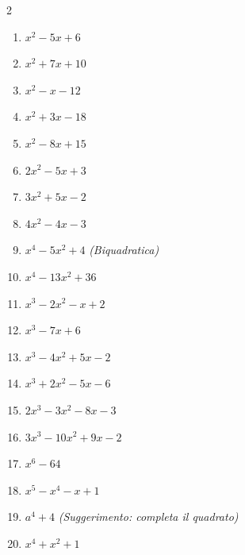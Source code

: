\begin{multicols}{2}
\begin{enumerate}
    \item {} $x^2 - 5x + 6$
    \item {} $x^2 + 7x + 10$
    \item {} $x^2 - x - 12$
    \item {} $x^2 + 3x - 18$
    \item {} $x^2 - 8x + 15$
    \item {} $2x^2 - 5x + 3$
    \item {} $3x^2 + 5x - 2$
    \item {} $4x^2 - 4x - 3$
    \item {} $x^4 - 5x^2 + 4$ \textit{(Biquadratica)}
    \item {} $x^4 - 13x^2 + 36$
    
    \item {} $x^3 - 2x^2 - x + 2$
    \item {} $x^3 - 7x + 6$
    \item {} $x^3 - 4x^2 + 5x - 2$
    \item {} $x^3 + 2x^2 - 5x - 6$
    \item {} $2x^3 - 3x^2 - 8x - 3$
    \item {} $3x^3 - 10x^2 + 9x - 2$
    \item {} $x^6 - 64$
    \item {} $x^5 - x^4 - x + 1$
    \item {} $a^4 + 4$ \textit{(Suggerimento: completa il quadrato)}
    \item {} $x^4 + x^2 + 1$
\end{enumerate}
\end{multicols}

